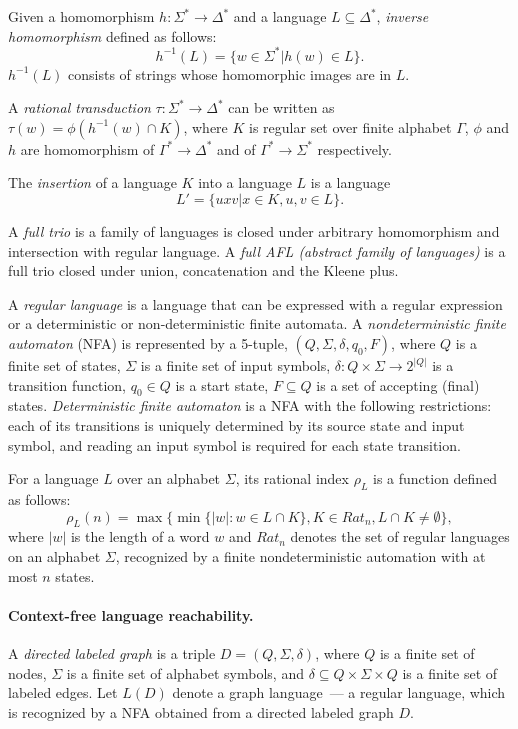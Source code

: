 Given a homomorphism $h: \Sigma^* \rightarrow \Delta^*$ and a language $L \subseteq \Delta^*$, \textit{inverse homomorphism} defined as follows: 
$$h^{-1}(L)= \{w \in \Sigma^* | h(w) \in L\}.$$ 
$h^{-1}(L)$ consists of strings whose homomorphic images are in $L$.


A \textit{rational transduction} $\tau: \Sigma^* \rightarrow \Delta^*$ can be written as $\tau(w)=\phi(h^{-1}(w) \cap K)$, where $K$ is regular set over finite alphabet $\Gamma$, $\phi$ and $h$ are homomorphism of $\Gamma^* \rightarrow \Delta^*$ and of $\Gamma^* \rightarrow \Sigma^*$ respectively.


The \textit{insertion} of a language $K$ into a language $L$ is a language $$L' = \{uxv|x \in K, u, v \in L\}.$$ 


A \textit{full trio} is a family of languages is closed under arbitrary homomorphism and intersection with regular language. A \textit{full AFL (abstract family of languages)} is a full trio closed under union, concatenation and the Kleene plus. 


A \textit{regular language} is a language that can be expressed with a regular expression or a deterministic or non-deterministic finite automata.
A \textit{nondeterministic finite automaton} (NFA) is represented by a 5-tuple, $(Q,\Sigma ,\delta ,q_{0},F)$, where $Q$ is a finite set of states, $\Sigma$ is a finite set of input symbols, $\delta:Q\times \Sigma \rightarrow 2^{|Q|}$ is a transition function, $q_0 \in Q$ is a start state, $F \subseteq Q$ is a set of accepting (final) states. \textit{Deterministic finite automaton} is a NFA with the following restrictions: each of its transitions is uniquely determined by its source state and input symbol, and reading an input symbol is required for each state transition.


 For a language $L$ over an alphabet $\Sigma$, its rational index $\rho_L$ is a function defined as follows:
$$\rho_L(n) = \max\{\min\{|w|:w \in L \cap K\}, K \in {Rat}_n, L \cap K \neq \emptyset\},$$ where $|w|$ is the length of a word $w$ and ${Rat}_n$ denotes the set of regular languages on an alphabet $\Sigma$, recognized by a finite nondeterministic automation with at most $n$ states.
\paragraph{Context-free language reachability.} 
A \textit{directed labeled graph} is a triple $D = (Q, \Sigma, \delta)$, where $Q$ is a finite set of nodes, $\Sigma$ is a finite set of alphabet symbols,
and $\delta \subseteq Q \times \Sigma \times Q$ is a finite set of labeled edges. Let $L(D)$ denote a graph language~--- a regular language, which is recognized by a NFA obtained from a directed labeled graph $D$.



